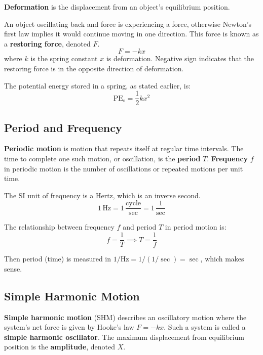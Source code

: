\documentclass{article}
\newcommand{\definition}[1]{\begin{tcolorbox}[colback=red!5!white,colframe=red!75!black,parbox=false] #1 \end{tcolorbox}}
\newcommand{\theorem}[2]{\begin{tcolorbox}[title={#1},colback=blue!5!white,colframe=blue!75!black,parbox=false] #2 \end{tcolorbox}}
\begin{document}
\definition{\textbf{Deformation} is the displacement from an object's equilibrium position.}

\theorem{Hooke's law}{An object oscillating back and force is experiencing a force, otherwise Newton's first law implies it would continue moving in one direction. This force is known as a \textbf{restoring force}, denoted $F$.
\begin{equation*}
    F=-kx
\end{equation*}
where $k$ is the spring constant $x$ is deformation. Negative sign indicates that the restoring force is in the opposite direction of deformation.}

The potential energy stored in a spring, as stated earlier, is:
\begin{equation*}
	\text{PE}_\text{s}=\frac12kx^2
\end{equation*}

\subsection{Period and Frequency}

\definition{\textbf{Periodic motion} is motion that repeats itself at regular time intervals. The time to complete one such motion, or oscillation, is the \textbf{period} $T$. \textbf{Frequency} $f$ in periodic motion is the number of oscillations or repeated motions per unit time.}

The SI unit of frequency is a Hertz, which is an inverse second.
\begin{equation*}
	1\,\si{\hertz}
	=1\,\frac{\text{cycle}}{\si{\sec}}
	=1\,\frac{1}{\si{\sec}}
\end{equation*}

\theorem*{The relationship between frequency $f$ and period $T$ in period motion is:
\begin{equation*}
    f=\frac{1}{T}
	\implies T=\frac{1}{f}
\end{equation*}}
Then period (time) is measured in $1/\si{\hertz}=1/(1/\si{\sec})=\si{\sec}$, which makes sense.

\subsection{Simple Harmonic Motion}

\definition{\textbf{Simple harmonic motion} (SHM) describes an oscillatory motion where the system's net force is given by Hooke's law $F=-kx$. Such a system is called a \textbf{simple harmonic oscillator}. The maximum displacement from equilibrium position is the \textbf{amplitude}, denoted $X$.}
\end{document}
